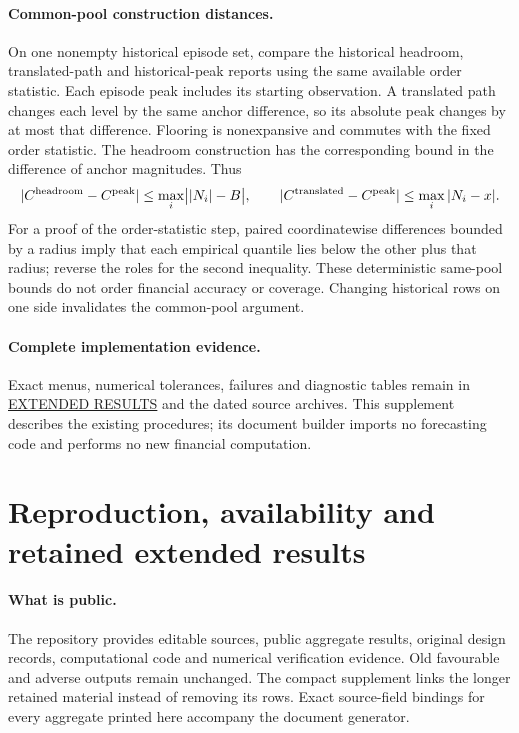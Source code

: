 \documentclass[11pt,a4paper]{article}
\begin{document}
\paragraph{Common-pool construction distances.}
On one nonempty historical episode set, compare the historical headroom,
translated-path and historical-peak reports using the same available order
statistic. Each episode peak includes its starting observation. A translated
path changes each level by the same anchor difference, so its absolute peak
changes by at most that difference. Flooring is nonexpansive and commutes with
the fixed order statistic. The headroom construction has the corresponding
bound in the difference of anchor magnitudes. Thus
\[
|C^{\rm headroom}-C^{\rm peak}|\le\max_i\bigl||N_i|-B\bigr|,\qquad
|C^{\rm translated}-C^{\rm peak}|\le\max_i|N_i-x|.
\]
For a proof of the order-statistic step, paired coordinatewise differences
bounded by a radius imply that each empirical quantile lies below the other
plus that radius; reverse the roles for the second inequality. These
deterministic same-pool bounds do not order financial accuracy or coverage.
Changing historical rows on one side invalidates the common-pool argument.

\paragraph{Complete implementation evidence.}
Exact menus, numerical tolerances, failures and diagnostic tables remain in
\href{https://github.com/ByronLi0207/financial-mathematics-paper-20261020/blob/revision-v7-final/EXTENDED_RESULTS.md}{EXTENDED RESULTS} and the dated source archives.
This supplement describes the existing procedures; its document builder
imports no forecasting code and performs no new financial computation.\section{Reproduction, availability and retained extended results}\label{sup:reproduction}

\paragraph{What is public.}
The repository provides editable sources, public aggregate results, original
design records, computational code and numerical verification evidence. Old
favourable and adverse outputs remain unchanged. The compact supplement links
the longer retained material instead of removing its rows. Exact source-field
bindings for every aggregate printed here accompany the document generator.
\end{document}
